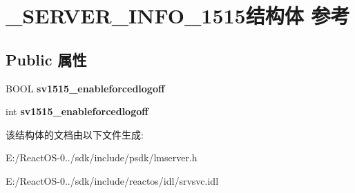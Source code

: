 \hypertarget{struct___s_e_r_v_e_r___i_n_f_o__1515}{}\section{\+\_\+\+S\+E\+R\+V\+E\+R\+\_\+\+I\+N\+F\+O\+\_\+1515结构体 参考}
\label{struct___s_e_r_v_e_r___i_n_f_o__1515}
\subsection*{Public 属性}
\begin{DoxyCompactItemize}
\item 
\mbox{\label{struct___s_e_r_v_e_r___i_n_f_o__1515_a7d6102ed7bf990d94a457716fb5121ed}} 
B\+O\+OL {\bfseries sv1515\+\_\+enableforcedlogoff}
\item 
\mbox{\label{struct___s_e_r_v_e_r___i_n_f_o__1515_a990995b3eb6e6c85efe321423c1e1f6f}} 
int {\bfseries sv1515\+\_\+enableforcedlogoff}
\end{DoxyCompactItemize}


该结构体的文档由以下文件生成\+:\begin{DoxyCompactItemize}
\item 
E\+:/\+React\+O\+S-\/0../sdk/include/psdk/lmserver.\+h\item 
E\+:/\+React\+O\+S-\/0../sdk/include/reactos/idl/srvsvc.\+idl\end{DoxyCompactItemize}
